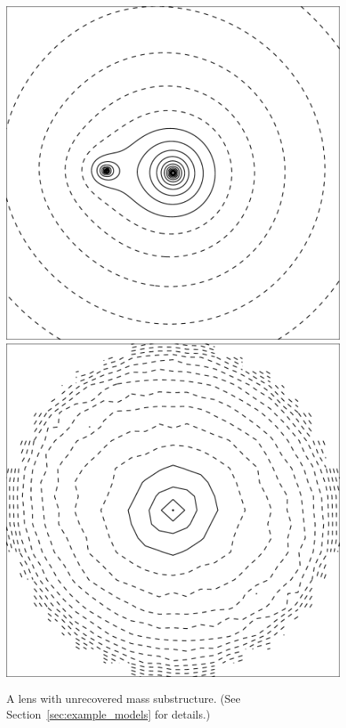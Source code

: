 \documentclass[usenatbib]{mn2e}
\newcommand{\secref}[1]{Section~\ref{sec:#1}}
\newlength{\myplotswidth}
\begin{document}
\begin{figure}
  \includegraphics[width=\myplotswidth]{fig/ASW000195x_006975_kappa}
  \includegraphics[width=\myplotswidth]{fig/006975_mass}
  \caption[result 6975 (ASW000195x)]{A lens with unrecovered mass
    substructure. (See \secref{example_models} for details.)
    \vspace{1em}
    }
  \label{fig:6975}
\end{figure}
\end{document}
